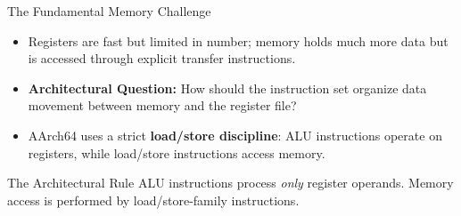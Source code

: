 \documentclass[aspectratio=169,11pt,t]{beamer}
\newcommand{\key}[1]{\textbf{#1}}
\begin{document}
\begin{frame}{The Fundamental Memory Challenge}
\large
\begin{itemize}\setlength{\itemsep}{7pt}
  \item Registers are fast but limited in number; memory holds much more data but is accessed through explicit transfer instructions.
  \item \key{Architectural Question:} How should the instruction set organize data movement between memory and the register file?
  \item AArch64 uses a strict \key{load/store discipline}: ALU instructions operate on registers, while load/store instructions access memory.
\end{itemize}

\vspace{0.35cm}
\begin{block}{The Architectural Rule}
ALU instructions process \emph{only} register operands. Memory access is performed by load/store-family instructions.
\end{block}
\end{frame}

\end{document}
